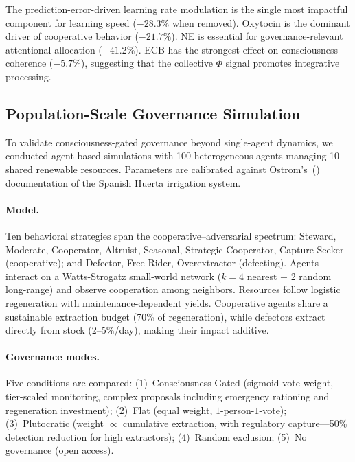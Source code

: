 \documentclass[11pt,a4paper]{article}
\begin{document}
The prediction-error-driven learning rate modulation is the single most impactful component for learning speed ($-28.3\%$ when removed).
Oxytocin is the dominant driver of cooperative behavior ($-21.7\%$).
NE is essential for governance-relevant attentional allocation ($-41.2\%$).
ECB has the strongest effect on consciousness coherence ($-5.7\%$), suggesting that the collective $\Phi$ signal promotes integrative processing.


\subsection{Population-Scale Governance Simulation}
\label{sec:population-sim}

To validate consciousness-gated governance beyond single-agent dynamics, we conducted
agent-based simulations with 100 heterogeneous agents managing 10 shared renewable resources.
Parameters are calibrated against Ostrom's~(\citeyear{ostrom1990}) documentation of the
Spanish Huerta irrigation system.

\paragraph{Model.}
Ten behavioral strategies span the cooperative--adversarial spectrum: Steward, Moderate,
Cooperator, Altruist, Seasonal, Strategic Cooperator, Capture Seeker (cooperative); and
Defector, Free Rider, Overextractor (defecting). Agents interact on a Watts-Strogatz
small-world network ($k{=}4$ nearest $+$ 2 random long-range) and observe cooperation
among neighbors. Resources follow logistic regeneration with maintenance-dependent yields.
Cooperative agents share a sustainable extraction budget (70\% of regeneration), while
defectors extract directly from stock (2--5\%/day), making their impact additive.

\paragraph{Governance modes.}
Five conditions are compared: (1)~Consciousness-Gated (sigmoid vote weight, tier-scaled
monitoring, complex proposals including emergency rationing and regeneration investment);
(2)~Flat (equal weight, $1$-person-$1$-vote); (3)~Plutocratic (weight $\propto$
cumulative extraction, with regulatory capture---50\% detection reduction for high
extractors); (4)~Random exclusion; (5)~No governance (open access).
\end{document}
